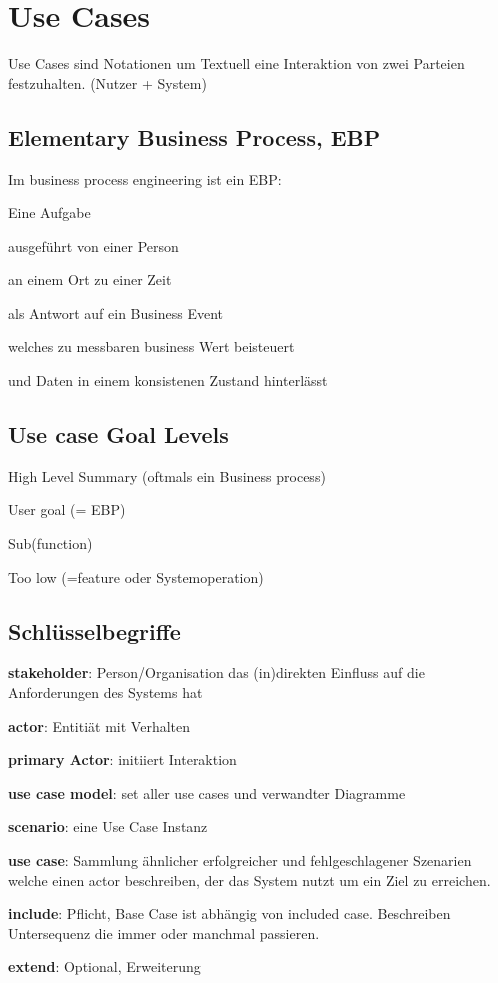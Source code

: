 
\chapter{Use Cases}
Use Cases sind Notationen um Textuell eine Interaktion von
zwei Parteien festzuhalten. (Nutzer + System)

\section{Elementary Business Process, EBP}
Im business process engineering ist ein EBP:
\begin{compactitem}
    \item Eine Aufgabe
    \item ausgeführt von einer Person
    \item an einem Ort zu einer Zeit
    \item als Antwort auf ein Business Event
    \item welches zu messbaren business Wert beisteuert
    \item und Daten in einem konsistenen Zustand hinterlässt
\end{compactitem}

\section{Use case Goal Levels}
\begin{compactitem}
    \item High Level Summary (oftmals ein Business process)
    \item User goal (= EBP)
    \item Sub(function)
    \item Too low (=feature oder Systemoperation)
\end{compactitem}

\section{Schlüsselbegriffe}
\begin{compactitem}
    \item \textbf{stakeholder}: Person/Organisation das (in)direkten Einfluss
    auf die Anforderungen des Systems hat
    \item \textbf{actor}: Entitiät mit Verhalten
    \item \textbf{primary Actor}: initiiert Interaktion
    \item \textbf{use case model}: set aller use cases und verwandter Diagramme
    \item \textbf{scenario}: eine Use Case Instanz
    \item \textbf{use case}: Sammlung ähnlicher erfolgreicher und fehlgeschlagener
    Szenarien welche einen actor beschreiben, der das System nutzt um ein Ziel
    zu erreichen.
    \item \textbf{include}: Pflicht, Base Case ist abhängig von included case.
    Beschreiben Untersequenz die immer oder manchmal passieren.
    \item \textbf{extend}: Optional, Erweiterung
\end{compactitem}


